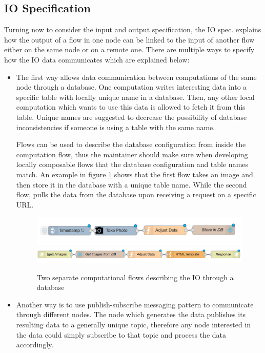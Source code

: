 \subsection{IO Specification}
Turning now to consider the input and output specification, the IO spec. explains how the output of a flow in one node can be linked to the input of another flow either on the same node or on a remote one. There are multiple ways to specify how the IO data communicates which are explained below:


\begin{itemize}
	\item The first way allows data communication between computations of the same node  through a database. One computation writes interesting data into a specific table with locally unique name in a database. Then, any other local computation which wants to use this data is allowed to fetch it from this table. Unique names are suggested to decrease the possibility of database inconsistencies if someone is using a table with the same name.
	 
	Flows can be used to describe the database configuration from inside the computation flow, thus the maintainer should make sure when developing  locally composable flows that the database configuration and table names match. An example in figure \ref{fig:db} shows that the first flow takes an image and then store it in the database with a unique table name.  While the second flow, pulls the data from the database upon receiving a request on a specific URL. 
	
	\begin{figure}[H]
		\centering
		\includegraphics[scale=0.5]{images/db-out.png}
		\includegraphics[scale=0.5]{images/db-in.png}
		\caption{Two separate computational flows describing the IO through a database }
		\label{fig:db}
	\end{figure}
	
	\item Another way is to use  publish-subscribe messaging pattern to communicate through different nodes. The node which generates the data publishes its resulting data to a generally unique topic, therefore any node interested in the data could simply subscribe to that topic and process the data accordingly.
	

\end{itemize}
